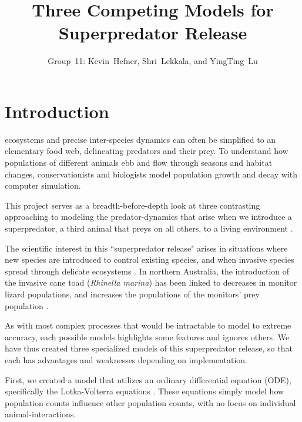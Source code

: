 \documentclass[journal]{IEEEtran}
\begin{document}
\title{Three Competing Models for Superpredator Release}

\author{Group~11:
    Kevin~Hefner,
    Shri~Lekkala,
    and YingTing~Lu}
    

\maketitle

\section{Introduction}
 ecosystems and precise inter-species dynamics can often be simplified to an elementary food web, delineating predators and their prey. To understand how populations of different animals ebb and flow through seasons and habitat changes, conservationists and biologists model population growth and decay with computer simulation.\par
This project serves as a breadth-before-depth look at three contrasting approaching to modeling the predator-dynamics that arise when we introduce a superpredator, a third animal that preys on all others, to a living environment \cite{cats_protecting_birds, cats_protecting_revisited}.\par
The scientific interest in this ``superpredator release" arises in situations where new species are introduced to control existing species, and when invasive species spread through delicate ecosystems \cite{invasive_species}. In northern Australia, the introduction of the invasive cane toad (\emph{Rhinella marina}) has been linked to decreases in monitor lizard populations, and increases the populations of the monitors' prey population \cite{Invasive_toads}.\par
As with most complex processes that would be intractable to model to extreme accuracy, each possible models highlights some features and ignores others. We have thus created three specialized models of this superpredator release, so that each has advantages and weaknesses depending on implementation.\par
First, we created a model that utilizes an ordinary differential equation (ODE), specifically the Lotka-Volterra equations \cite{meiss_textbook}. These equations simply model how population counts influence other population counts, with no focus on individual animal-interactions.\par
\end{document}
